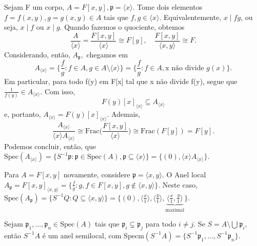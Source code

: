 \documentclass[AlgebraII/algebraII_notes.tex]{subfiles}
\begin{document}
\begin{example}
	Sejam F um corpo, \(A = F[x, y], \mathfrak{p} = \langle x \rangle\). Tome dois elementos \(f = f(x, y), g = g(x, y)\in A\) tais que
	\(f, g\in \langle x \rangle.\) Equivalentemente, \(x\mid fg\), ou seja, \(x\mid f\) ou \(x\mid g\). Quando fazemos o quociente, obtemos
	\[
		\frac{A}{\langle x \rangle} = \frac{F[x, y]}{\langle x \rangle}\cong F[y], \quad \frac{F[x, y]}{\langle x, y \rangle}\cong F.
	\]
	Considerando, então, \(A_{\mathfrak{p}},\) chegamos em
	\[
		A_{\langle x \rangle}= \biggl\{\frac{f}{g}: f\in A, g\in A\setminus{\langle x \rangle}\biggr\} = \biggl\{\frac{f}{g}: f\in A, \text{x não divide }g(x)\biggr\}.
	\]
	Em particular, para todo f(y) em F[x] tal que x não divide f(y), segue que \(\frac{1}{f(y)}\in A_{\langle x \rangle}.\) Com isso,
	\[
		F(y)[x]_{\langle x \rangle}\subseteq A_{\langle x \rangle}
	\]
	e, portanto, \(A_{\langle x \rangle} = F(y)[x]_{\langle x \rangle}\). Ademais,
	\[
		\frac{A_{\langle x \rangle}}{\langle x \rangle A_{\langle x \rangle}} \cong \mathrm{Frac}\biggl(\frac{F[x, y]}{\langle x \rangle}\biggr) \cong \mathrm{Frac}(F[y]) = F[y].
	\]
	Podemos concluir, então, que \(\mathrm{Spec}(A_{\langle x \rangle}) = \{S^{-1}\mathfrak{p}:\mathfrak{p}\in \mathrm{Spec}(A), \mathfrak{p}\subseteq \langle x \rangle\} = \{(0), \langle x \rangle A_{\langle x \rangle}\}\).
\end{example}
\begin{example}
	Para \(A = F[x, y]\) novamente, considere \(\mathfrak{p} = \langle x, y \rangle\). O Anel local \(A_{\mathfrak{p}} = F[x, y]_{\langle x, y \rangle} = \biggl\{\frac{f}{g}: g, f\in F[x, y], g\not\in \langle x, y \rangle\biggr\}.\)
	Neste caso, \(\mathrm{Spec}(A_{\mathfrak{p}}) = \{S^{-1}Q: Q\subseteq \langle x, y \rangle\} = \{(0), \langle \frac{x}{1} \rangle, \langle \frac{y}{1} \rangle, \underbrace{\langle \frac{x}{1}, \frac{y}{1} \rangle}_{\text{maximal}}\}\).
\end{example}
\begin{prop*}[Exercício]
	Sejam \(\mathfrak{p}_{1}, \dotsc, \mathfrak{p}_{n}\in \mathrm{Spec}(A)\) tais que \(\mathfrak{p}_{i}\subsetneq \mathfrak{p}_{j} \) para todo
	\(i\neq j\). Se \(S = A\setminus{\bigcup_{}^{}\mathfrak{p}_{i}}\), então \(S^{-1}A\) é um anel semilocal, com \(\mathrm{Specm}(S^{-1}A) = \{S^{-1}\mathfrak{p}_{1}, \dotsc, S^{-1}\mathfrak{p}_{n}\}\).
\end{prop*}
\end{document}
